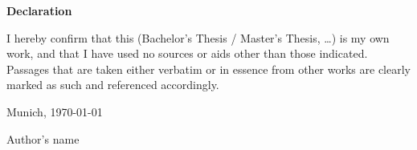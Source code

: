 \cleardoublepage{}

\thispagestyle{empty}

\vspace*{0.5\textheight}
\noindent

\makeatletter

\begin{center}
    {\textbf{Declaration}}
\end{center}

\begin{flushleft}
    I hereby confirm that this (Bachelor's Thesis / Master's Thesis, \ldots) is my own work, and that I have used no sources or aids other than those indicated. Passages that are taken either verbatim or in essence from other works are clearly marked as such and referenced accordingly.

    \makeatother

    \vspace{15mm}
    \noindent

    Munich, \today{}

    Author's name
\end{flushleft}

\cleardoublepage{}
